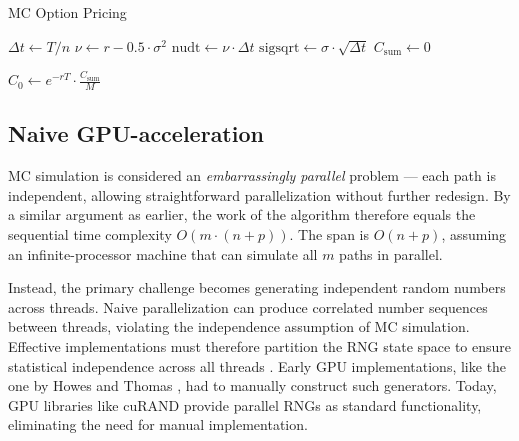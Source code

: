 \documentclass[english,12pt,a4paper,pdftex,sci,utf8]{aaltothesis}
\begin{document}
\begin{algorithm}
\LinesNumbered
\caption{MC Option Pricing}
\label{alg:MC-algo}

$\Delta t \gets T/n$\;
$\nu \gets r - 0.5 \cdot \sigma^2$\;
$\text{nudt} \gets \nu \cdot \Delta t$\;
$\text{sigsqrt} \gets \sigma \cdot \sqrt{\Delta t}$\;
$C_{\text{sum}} \gets 0$\;

\BlankLine
{}

\BlankLine
{}
$C_0 \gets e^{-rT} \cdot \frac{C_{\text{sum}}}{M}$\;

\;
\end{algorithm}


\subsection{Naive GPU-acceleration}
MC simulation is considered an \emph{embarrassingly parallel} problem --- each path is independent, allowing straightforward parallelization without further redesign. By a similar argument as earlier, the work of the algorithm therefore equals the sequential time complexity $O(m \cdot (n+p))$. The span is $O(n+p)$, assuming an infinite-processor machine that can simulate all $m$ paths in parallel.

Instead, the primary challenge becomes generating independent random numbers across threads. Naive parallelization can produce correlated number sequences between threads, violating the independence assumption of MC simulation. Effective implementations must therefore partition the RNG state space to ensure statistical independence across all threads \cite{gentle2003random}. Early GPU implementations, like the one by Howes and Thomas \cite{nguyen2007gpu}, had to manually construct such generators. Today, GPU libraries like cuRAND \cite{curand2025} provide parallel RNGs as standard functionality, eliminating the need for manual implementation.
\end{document}
